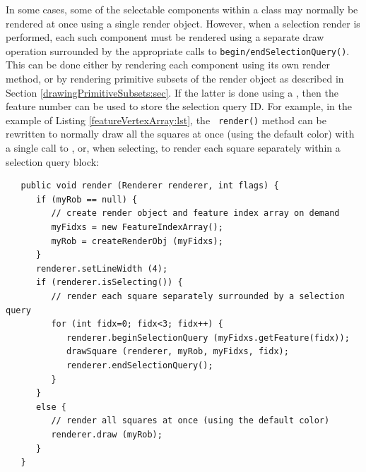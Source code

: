 In some cases, some of the selectable components within a class may
normally be rendered at once using a single render object. However,
when a selection render is performed, each such component must be
rendered using a separate draw operation surrounded by the appropriate
calls to {\tt begin/endSelectionQuery()}. This can be done either by
rendering each component using its own render method, or by rendering
primitive subsets of the render object as described in Section
\ref{drawingPrimitiveSubsets:sec}. If the latter is done using a
, then the feature
number can be used to store the selection query ID. For example, in
the example of Listing \ref{featureVertexArray:lst}, the {\tt
render()} method can be rewritten to normally draw all the squares at
once (using the default color) with a single call to
, or, when
selecting, to render each square separately within a selection query
block:
%
\begin{lstlisting}
   public void render (Renderer renderer, int flags) {
      if (myRob == null) {
         // create render object and feature index array on demand
         myFidxs = new FeatureIndexArray();
         myRob = createRenderObj (myFidxs);
      }
      renderer.setLineWidth (4);
      if (renderer.isSelecting()) {
         // render each square separately surrounded by a selection query
         for (int fidx=0; fidx<3; fidx++) {
            renderer.beginSelectionQuery (myFidxs.getFeature(fidx));
            drawSquare (renderer, myRob, myFidxs, fidx);
            renderer.endSelectionQuery();
         }
      }
      else {
         // render all squares at once (using the default color)
         renderer.draw (myRob);
      }
   }
\end{lstlisting}
%

